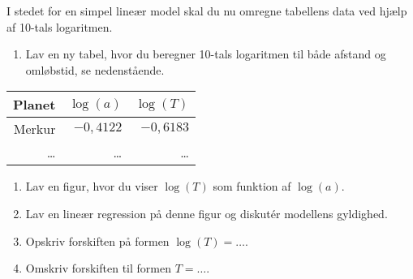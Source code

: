 \documentclass[12pt,oneside,a4paper]{article}
\theoremstyle{plain}
\begin{document}
I stedet for en simpel lineær model skal du nu omregne tabellens data ved hjælp af 
10-tals logaritmen.
\begin{enumerate}[label=\alph*. ,resume]
    \item Lav en ny tabel, hvor du beregner 10-tals logaritmen til både afstand
        og omløbstid, se nedenstående.
\end{enumerate}

\begin{center}
\begin{tabular}{r|r|r}
    \hline
    Planet  & $\log(a)$   & $\log(T)$ \\
    \hline 
    Merkur  &  $-0,4122$ &   $-0,6183$ \\
    \ldots  & \ldots    & \ldots  \\
    \hline 
\end{tabular}
\end{center}

\begin{enumerate}[label=\alph*. ,resume]
    \item Lav en figur, hvor du viser $\log(T)$ som funktion af $\log(a)$.
    \item Lav en lineær regression på denne figur og diskutér modellens gyldighed.
    \item Opskriv forskiften på formen $\log(T) = \ldots$.
    \item Omskriv forskiften til formen $T = \ldots$.
\end{enumerate}
\end{document}
